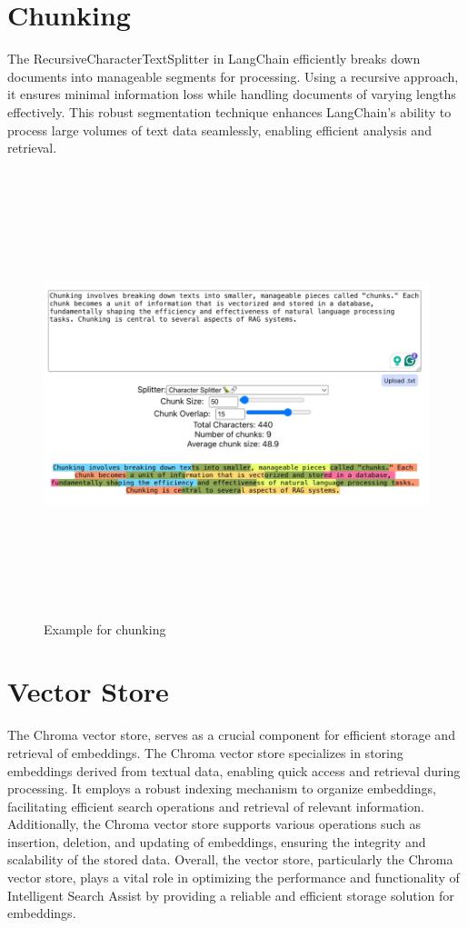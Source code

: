 \documentclass[12pt,a4paper,oneside]{report}
\begin{document}
\section{Chunking}
\par

The RecursiveCharacterTextSplitter in LangChain efficiently breaks down documents into manageable segments for processing. Using a recursive approach, it ensures minimal information loss while handling documents of varying lengths effectively. This robust segmentation technique enhances LangChain's ability to process large volumes of text data seamlessly, enabling efficient analysis and retrieval.


\begin{figure}[ht]
    \centering
    \includegraphics[width=145mm , height = 130mm]{images/chunking.png}
    \caption{Example for chunking}
    \label{fig:figure2_2}
\end{figure}

\section{Vector Store}
\par The  Chroma vector store, serves as a crucial component for efficient storage and retrieval of embeddings. The Chroma vector store specializes in storing embeddings derived from textual data, enabling quick access and retrieval during processing. It employs a robust indexing mechanism to organize embeddings, facilitating efficient search operations and retrieval of relevant information. Additionally, the Chroma vector store supports various operations such as insertion, deletion, and updating of embeddings, ensuring the integrity and scalability of the stored data. Overall, the vector store, particularly the Chroma vector store, plays a vital role in optimizing the performance and functionality of Intelligent Search Assist by providing a reliable and efficient storage solution for embeddings.
\end{document}
